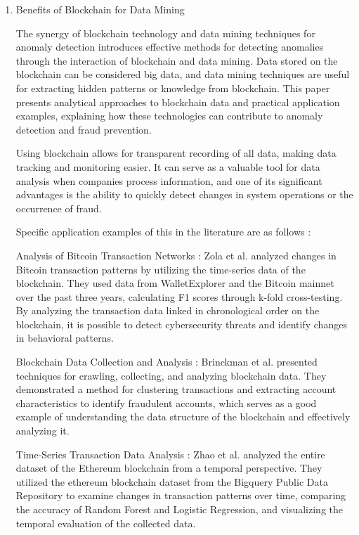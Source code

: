 \documentclass[conference]{IEEEtran}
\begin{document}
\begin{enumerate}[itemsep=2ex, parsep=1ex]
	\item Benefits of Blockchain for Data Mining
	      
	      The synergy of blockchain technology and data mining techniques for anomaly detection introduces effective methods for detecting anomalies through the interaction of blockchain and data mining. Data stored on the blockchain can be considered big data, and data mining techniques are useful for extracting hidden patterns or knowledge from blockchain. This paper presents analytical approaches to blockchain data and practical application examples, explaining how these technologies can contribute to anomaly detection and fraud prevention.
	      
	      Using blockchain allows for transparent recording of all data, making data tracking and monitoring easier. It can serve as a valuable tool for data analysis when companies process information, and one of its significant advantages is the ability to quickly detect changes in system operations or the occurrence of fraud.
	              
	      Specific application examples of this in the literature are as follows :
	      
	      Analysis of Bitcoin Transaction Networks : Zola et al. analyzed changes in Bitcoin transaction patterns by utilizing the time-series data of the blockchain. They used data from WalletExplorer and the Bitcoin mainnet over the past three years, calculating F1 scores through k-fold cross-testing. By analyzing the transaction data linked in chronological order on the blockchain, it is possible to detect cybersecurity threats and identify changes in behavioral patterns.
	      
	      
	      Blockchain Data Collection and Analysis : Brinckman et al. presented techniques for crawling, collecting, and analyzing blockchain data. They demonstrated a method for clustering transactions and extracting account characteristics to identify fraudulent accounts, which serves as a good example of understanding the data structure of the blockchain and effectively analyzing it.
	      
	      
	      Time-Series Transaction Data Analysis : Zhao et al. analyzed the entire dataset of the Ethereum blockchain from a temporal perspective. They utilized the ethereum blockchain dataset from the Bigquery Public Data Repository to examine changes in transaction patterns over time, comparing the accuracy of Random Forest and Logistic Regression, and visualizing the temporal evaluation of the collected data.
	      

\end{enumerate}
\end{document}
